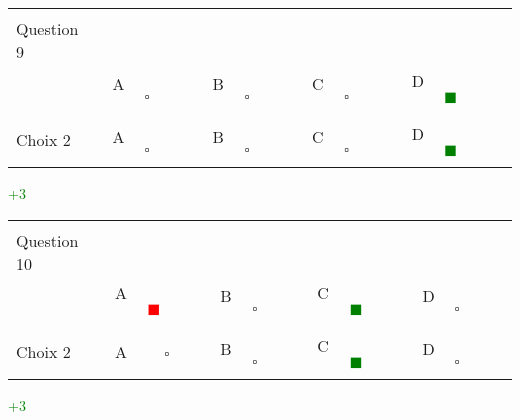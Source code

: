 \documentclass{book}%
\begin{document}
\thispagestyle{empty}%
\begin{center}%
\begin{tabular}{| l  l  l  l  l |}%
\hline%
 & & & & \\%
Question 9\qquad \qquad\ & & & & \\%
& A $\qquad \square \qquad$& B $\qquad \square \qquad$& C $\qquad \square \qquad$& D \textcolor{green}{$\qquad \blacksquare \qquad$}\\%
 & & & & \\%
\hline%
 & & & &  \\%
Choix 2& A $\qquad \square \qquad$& B $\qquad \square \qquad$& C $\qquad \square \qquad$& D \textcolor{green}{$\qquad \blacksquare \qquad$}\\%
 & & & &  \\%
\hline%
\end{tabular}%
 \qquad  \textcolor{green}{+3}%
\\ \vskip3mm%
\end{center}%
\thispagestyle{empty}%
\begin{center}%
\begin{tabular}{| l  l  l  l  l |}%
\hline%
 & & & & \\%
Question 10\qquad \qquad\ & & & & \\%
& A \textcolor{red}{$\qquad \blacksquare \qquad$}& B $\qquad \square \qquad$& C \textcolor{green}{$\qquad \blacksquare \qquad$}& D $\qquad \square \qquad$\\%
 & & & & \\%
\hline%
 & & & &  \\%
Choix 2& A $\qquad \square \qquad$& B $\qquad \square \qquad$& C \textcolor{green}{$\qquad \blacksquare \qquad$}& D $\qquad \square \qquad$\\%
 & & & &  \\%
\hline%
\end{tabular}%
 \qquad  \textcolor{green}{+3}%
\\ \vskip3mm%
\end{center}%
\end{document}
